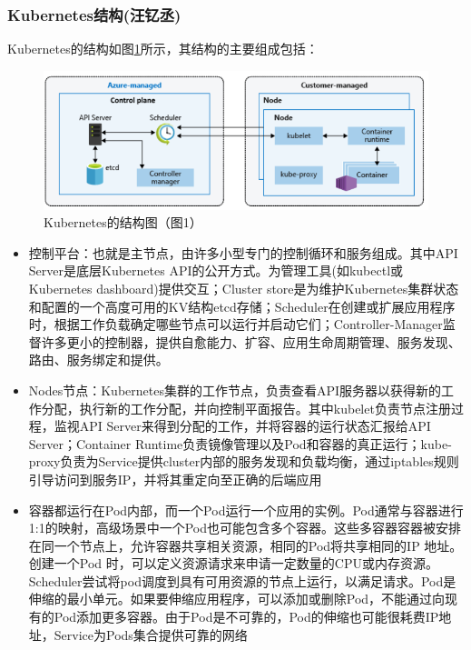 \documentclass[11pt]{article}
\begin{document}
\subsubsection{Kubernetes结构(汪钇丞)}
Kubernetes的结构如图\ref{figs:Structure}所示，其结构的主要组成包括：
\begin{figure}[!htbp]
	\centering
	\includegraphics[scale=0.5]{figs/Kubernetes.PNG}
	\caption{Kubernetes的结构图（\cite{Kubernetes}图1）}
	\label{figs:Structure}
\end{figure}
\begin{itemize}
\setlength{\itemsep}{0pt}
\setlength{\parsep}{0pt}
\setlength{\parskip}{0pt}
    \item 控制平台：也就是主节点，由许多小型专门的控制循环和服务组成。其中API Server是底层Kubernetes API的公开方式。为管理工具(如kubectl或Kubernetes dashboard)提供交互；Cluster store是为维护Kubernetes集群状态和配置的一个高度可用的KV结构etcd存储；Scheduler在创建或扩展应用程序时，根据工作负载确定哪些节点可以运行并启动它们；Controller-Manager监督许多更小的控制器，提供自愈能力、扩容、应用生命周期管理、服务发现、路由、服务绑定和提供。
    \item Nodes节点：Kubernetes集群的工作节点，负责查看API服务器以获得新的工作分配，执行新的工作分配，并向控制平面报告。其中kubelet负责节点注册过程，监视API Server来得到分配的工作，并将容器的运行状态汇报给API Server；Container Runtime负责镜像管理以及Pod和容器的真正运行；kube-proxy负责为Service提供cluster内部的服务发现和负载均衡，通过iptables规则引导访问到服务IP，并将其重定向至正确的后端应用
    \item 容器都运行在Pod内部，而一个Pod运行一个应用的实例。Pod通常与容器进行1:1的映射，高级场景中一个Pod也可能包含多个容器。这些多容器容器被安排在同一个节点上，允许容器共享相关资源，相同的Pod将共享相同的IP 地址。创建一个Pod 时，可以定义资源请求来申请一定数量的CPU或内存资源。Scheduler尝试将pod调度到具有可用资源的节点上运行，以满足请求。Pod是伸缩的最小单元。如果要伸缩应用程序，可以添加或删除Pod，不能通过向现有的Pod添加更多容器。由于Pod是不可靠的，Pod的伸缩也可能很耗费IP地址，Service为Pods集合提供可靠的网络
\end{itemize}
\end{document}
